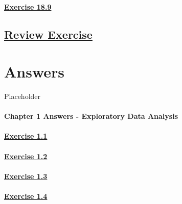 \documentclass[
  11pt,
]{book}
\begin{document}
\subsubsection*{\texorpdfstring{\hyperref[ex189a]{Exercise 18.9}}{Exercise 18.9}}\label{exercise-18.9}

\section*{\texorpdfstring{\hyperref[re18a]{Review Exercise}}{Review Exercise}}\label{review-exercise-17}

\chapter*{Answers}\label{answers}

Placeholder

\subsubsection*{Chapter 1 Answers - Exploratory Data Analysis}\label{chapter-1-answers---exploratory-data-analysis}

\subsubsection*{\texorpdfstring{\hyperref[ex11q]{Exercise 1.1}}{Exercise 1.1}}\label{exercise-1.1-1}

\subsubsection*{\texorpdfstring{\hyperref[ex12q]{Exercise 1.2}}{Exercise 1.2}}\label{exercise-1.2-1}

\subsubsection*{\texorpdfstring{\hyperref[ex13q]{Exercise 1.3}}{Exercise 1.3}}\label{exercise-1.3-1}

\subsubsection*{\texorpdfstring{\hyperref[ex14q]{Exercise 1.4}}{Exercise 1.4}}\label{exercise-1.4-1}
\end{document}
